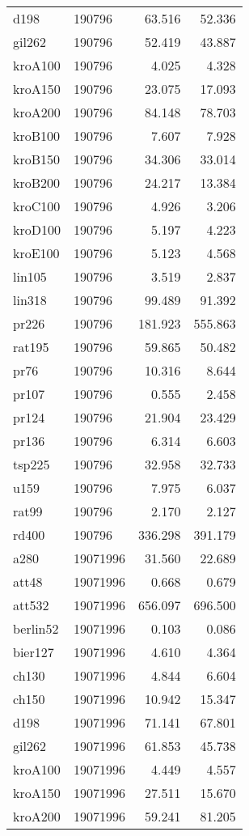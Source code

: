 \begin{center}
\begin{longtable}{llrr}
d198  & 190796 & 63.516& 52.336\\
gil262  & 190796 & 52.419& 43.887\\
kroA100  & 190796 & 4.025& 4.328\\
kroA150  & 190796 & 23.075& 17.093\\
kroA200  & 190796 & 84.148& 78.703\\
kroB100  & 190796 & 7.607& 7.928\\
kroB150  & 190796 & 34.306& 33.014\\
kroB200  & 190796 & 24.217& 13.384\\
kroC100  & 190796 & 4.926& 3.206\\
kroD100  & 190796 & 5.197& 4.223\\
kroE100  & 190796 & 5.123& 4.568\\
lin105  & 190796 & 3.519& 2.837\\
lin318  & 190796 & 99.489& 91.392\\
pr226  & 190796  & 181.923& 555.863\\
rat195  & 190796 & 59.865& 50.482\\
pr76  & 190796 &10.316& 8.644\\
pr107  & 190796 & 0.555& 2.458\\
pr124  & 190796 & 21.904& 23.429\\
pr136  & 190796 & 6.314& 6.603\\
tsp225  & 190796 & 32.958& 32.733\\
u159  & 190796 & 7.975& 6.037\\
rat99  & 190796 & 2.170& 2.127\\
rd400  & 190796 & 336.298& 391.179\\
a280  & 19071996 & 31.560& 22.689\\
att48  & 19071996 & 0.668& 0.679\\
att532  & 19071996 & 656.097& 696.500\\
berlin52  & 19071996 & 0.103 & 0.086\\
bier127  & 19071996 & 4.610& 4.364\\
ch130  & 19071996 & 4.844& 6.604\\
ch150  & 19071996 & 10.942& 15.347\\
d198  & 19071996 & 71.141& 67.801\\
gil262  & 19071996 &61.853&45.738\\
kroA100  & 19071996 & 4.449& 4.557\\
kroA150  & 19071996 &27.511& 15.670\\
kroA200  & 19071996 & 59.241& 81.205\\

\end{longtable}
\end{center}
